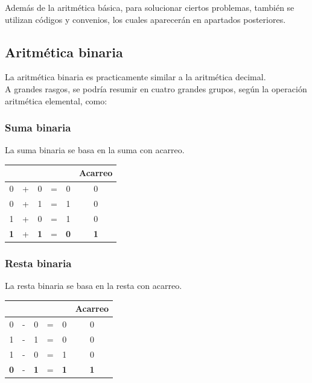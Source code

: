 \documentclass[12pt]{article}
\begin{document}
		Además de la aritmética básica, para solucionar ciertos problemas, también se utilizan códigos y convenios, los cuales aparecerán en apartados posteriores.
		
		\vfill
			
			\subsection{Aritmética binaria}
		
			La aritmética binaria es practicamente similar a la aritmética decimal.\\
		
			A grandes rasgos, se podría resumir en cuatro grandes grupos, según la operación aritmética elemental, como:\\
		
				\subsubsection{Suma binaria}
			
					La suma binaria se basa en la suma con acarreo.\\
				
					\begin{table}[H]
						\centering
						\begin{tabular}{ccccc||c}
							 &  &  &  &  & Acarreo \\
							\midrule
							0 & + & 0 & = & 0 & 0 \\
							0 & + & 1 & = & 1 & 0 \\
							1 & + & 0 & = & 1 & 0 \\
							\textbf{1} & + & \textbf{1} & = & \textbf{0} & \textbf{1} \\
						\end{tabular}
					\end{table}
					
					\newpage
				
				\subsubsection{Resta binaria}
			
					La resta binaria se basa en la resta con acarreo.\\
				
					\begin{table}[H]
						\centering
						\begin{tabular}{ccccc||c}
							 &  &  &  &  & Acarreo \\
							\midrule
							0 & - & 0 & = & 0 & 0 \\
							1 & - & 1 & = & 0 & 0 \\
							1 & - & 0 & = & 1 & 0 \\
							\textbf{0} & - & \textbf{1} & = & \textbf{1} & \textbf{1} \\
						\end{tabular}
					\end{table}
				
\end{document}
